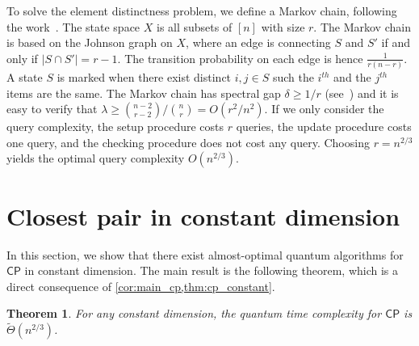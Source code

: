 \documentclass[10pt,a4paper]{article}
\newtheorem{theorem}{Theorem}
\newcommand{\wt}{\widetilde}
\renewcommand{\varepsilon}{\lambda}
\renewcommand{\tilde}{\wt}
\newcommand{\CP}{\ensuremath{\mathsf{CP}}}
\begin{document}
To solve the element distinctness problem, we define a Markov chain, following the work~\cite{r5,r11,r28}. The state space $X$ is all subsets of $[n]$ with size $r$. The Markov chain is based on the Johnson graph on $X$, where an edge is connecting $S$ and $S'$ if and only if $|S \cap S'| = r-1$. The transition probability on each edge is hence $\frac{1}{r(n-r)}$. A state $S$ is marked when there exist distinct $i, j \in S$ such the $i^{th}$ and the $j^{th}$ items are the same. The Markov chain has spectral gap $\delta \geq 1/r$ (see~\cite{r28}) and it is easy to verify that $\varepsilon \geq \binom{n-2}{r-2}/\binom{n}{r} = O(r^2/n^2)$. If we only consider the query complexity, the setup procedure costs $r$ queries, the update procedure costs one query, and the checking procedure does not cost any query. Choosing $r = n^{2/3}$ yields the optimal query complexity $O(n^{2/3})$.



\setcounter{section}{3}
\setcounter{theorem}{39}
\setcounter{figure}{2}
\section{Closest pair in constant dimension}
\label{sec:cp}

In this section, we show that there exist almost-optimal quantum algorithms for $\CP$ in constant dimension. The main result is the following theorem, which is a direct consequence of \cref{cor:main_cp,thm:cp_constant}.
\begin{theorem}
For any constant dimension, the quantum time complexity for $\CP$ is $\tilde{\Theta}(n^{2/3})$. 
\end{theorem}
\end{document}

